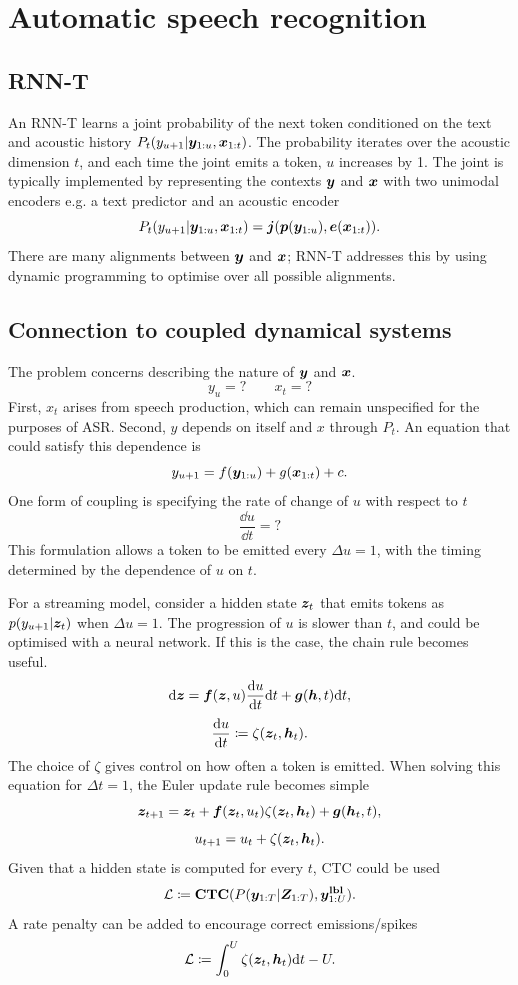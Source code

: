 \chapter{Automatic speech recognition}

\section{RNN-T}

An RNN-T learns a joint probability of the next token conditioned on the text and acoustic history $P_t(y_{u+1}|{\bm{y}}_{1:u},{\bm{x}}_{1:t})$. The probability iterates over the acoustic dimension $t$, and each time the joint emits a token, $u$ increases by 1. The joint is typically implemented by representing the contexts ${\bm{y}}$ and ${\bm{x}}$ with two unimodal encoders e.g. a text predictor and an acoustic encoder
\[
P_t(y_{u+1}|{\bm{y}}_{1:u},{\bm{x}}_{1:t}) = {\bm{j}}({\bm{p}}({\bm{y}}_{1:u}),{\bm{e}}({\bm{x}}_{1:t})).
\]
There are many alignments between ${\bm{y}}$ and ${\bm{x}}$; RNN-T addresses this by using dynamic programming to optimise over all possible alignments.

\section{Connection to coupled dynamical systems}
The problem concerns describing the nature of ${\bm{y}}$ and ${\bm{x}}$.
\[
y_u=? \qquad x_t=?
\]
First, $x_t$ arises from speech production, which can remain unspecified for the purposes of ASR. Second, $y$ depends on itself and $x$ through $P_t$. An equation that could satisfy this dependence is
\[
y_{u+1}=f({\bm{y}}_{1:u}) + g({\bm{x}}_{1:t}) + c.
\]
One form of coupling is specifying the rate of change of $u$ with respect to $t$
\[
\frac{\dd u}{\dd t}=?
\]
This formulation allows a token to be emitted every $\Delta u = 1$, with the timing determined by the dependence of $u$ on $t$.

For a streaming model, consider a hidden state ${\bm{z}}_t$ that emits tokens as $p(y_{u+1}|{\bm{z}}_t)$ when $\Delta u = 1$. The progression of $u$ is slower than $t$, and could be optimised with a neural network. If this is the case, the chain rule becomes useful.
\[
\mathrm{d} {\bm{z}}= {\bm{f}}({\bm{z}}, u)\frac{\mathrm{d} u}{\mathrm{d} t} \mathrm{d} t + {\bm{g}}({\bm{h}},t)\mathrm{d} t,
\]
\[
\frac{\mathrm{d} u}{\mathrm{d} t} \coloneqq \zeta({\bm{z}}_t,{\bm{h}}_t).
\]
The choice of $\zeta$ gives control on how often a token is emitted. When solving this equation for $\Delta t = 1$, the Euler update rule becomes simple
\[
{\bm{z}}_{t+1}= {\bm{z}}_t + {\bm{f}}({\bm{z}}_t,u_t)\zeta({\bm{z}}_t,{\bm{h}}_t) + {\bm{g}}({\bm{h}}_t,t),
\]
\[
u_{t+1} = u_t + \zeta({\bm{z}}_t,{\bm{h}}_t).
\]
Given that a hidden state is computed for every $t$, CTC could be used
\[
\mathcal{L} \coloneqq \mathbf{CTC}(P({\bm{y}}_{1:T}|{\bm{Z}}_{1:T}),{\bm{y}}^\mathbf{lbl}_{1:U}).
\]
A rate penalty can be added to encourage correct emissions/spikes
\[
\mathcal{L}\coloneqq \int_0^U\zeta({\bm{z}}_t,{\bm{h}}_t)\mathrm{d} t - U.
\]


